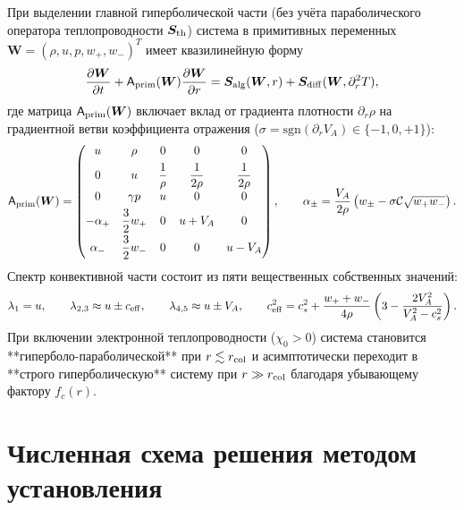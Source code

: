 \documentclass[11pt,a4paper]{article}
\begin{document}
При выделении главной гиперболической части (без учёта параболического оператора теплопроводности $\bm{S}_{\rm th}$) система в примитивных переменных $\bm{W} = (\rho, u, p, w_+, w_-)^T$ имеет квазилинейную форму
\begin{equation}
\frac{\partial\bm{W}}{\partial t} + \mathsf{A}_{\rm prim}(\bm{W})\frac{\partial\bm{W}}{\partial r} = \bm{S}_{\rm alg}(\bm{W}, r) + \bm{S}_{\rm diff}(\bm{W}, \partial_r^2 T),
\label{eq:quasilinear_form}
\end{equation}
где матрица $\mathsf{A}_{\rm prim}(\bm{W})$ включает вклад от градиента плотности $\partial_r\rho$ на градиентной ветви коэффициента отражения ($\sigma = \mathrm{sgn}(\partial_r V_A) \in \{-1, 0, +1\}$):
\begin{equation}
\mathsf{A}_{\rm prim}(\bm{W}) =
\begin{pmatrix}
u & \rho & 0 & 0 & 0 \\[4pt]
0 & u & \dfrac{1}{\rho} & \dfrac{1}{2\rho} & \dfrac{1}{2\rho} \\[6pt]
0 & \gamma p & u & 0 & 0 \\[4pt]
-\alpha_+ & \dfrac{3}{2}w_+ & 0 & u + V_A & 0 \\[6pt]
\alpha_- & \dfrac{3}{2}w_- & 0 & 0 & u - V_A
\end{pmatrix}, \qquad
\alpha_\pm = \frac{V_A}{2\rho}\left(w_\pm - \sigma\mathcal{C}\sqrt{w_+ w_-}\right).
\label{eq:A_prim}
\end{equation}
Спектр конвективной части состоит из пяти вещественных собственных значений:
\begin{equation}
\lambda_1 = u, \qquad \lambda_{2,3} \approx u \pm c_{\rm eff}, \qquad \lambda_{4,5} \approx u \pm V_A, \qquad c_{\rm eff}^2 = c_s^2 + \frac{w_+ + w_-}{4\rho}\left(3 - \frac{2 V_A^2}{V_A^2 - c_s^2}\right).
\label{eq:eigenvalues_approx}
\end{equation}
При включении электронной теплопроводности ($\chi_0 > 0$) система становится **гиперболо-параболической** при $r \lesssim r_{\rm col}$ и асимптотически переходит в **строго гиперболическую** систему при $r \gg r_{\rm col}$ благодаря убывающему фактору $f_c(r)$.

\section{Численная схема решения методом установления}
\end{document}
